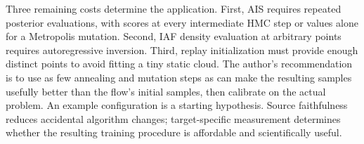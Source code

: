 \enlargethispage{\baselineskip}
Three remaining costs determine the application. First, AIS requires repeated
posterior evaluations, with scores at every intermediate HMC step or values
alone for a Metropolis mutation. Second, IAF density
evaluation at arbitrary points requires autoregressive inversion. Third, replay
initialization must provide enough distinct points to avoid fitting a tiny
static cloud. The author's recommendation is to use as few annealing and
mutation steps as can make the resulting samples usefully better than the
flow's initial samples, then calibrate on the actual problem. An example
configuration is a starting hypothesis. Source faithfulness reduces accidental
algorithm changes; target-specific measurement determines whether the resulting
training procedure is affordable and scientifically useful.
